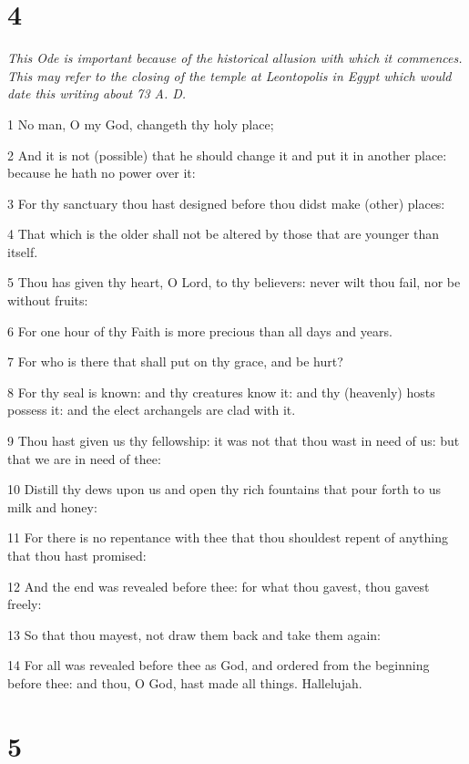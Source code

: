 \chapter{4}

\par \textit{This Ode is important because of the historical allusion with which it commences. This may refer to the closing of the temple at Leontopolis in Egypt which would date this writing about 73 A. D.}

\par 1 No man, O my God, changeth thy holy place;
\par 2 And it is not (possible) that he should change it and put it in another place: because he hath no power over it:
\par 3 For thy sanctuary thou hast designed before thou didst make (other) places:
\par 4 That which is the older shall not be altered by those that are younger than itself.
\par 5 Thou has given thy heart, O Lord, to thy believers: never wilt thou fail, nor be without fruits:
\par 6 For one hour of thy Faith is more precious than all days and years.
\par 7 For who is there that shall put on thy grace, and be hurt?
\par 8 For thy seal is known: and thy creatures know it: and thy (heavenly) hosts possess it: and the elect archangels are clad with it.
\par 9 Thou hast given us thy fellowship: it was not that thou wast in need of us: but that we are in need of thee:
\par 10 Distill thy dews upon us and open thy rich fountains that pour forth to us milk and honey:
\par 11 For there is no repentance with thee that thou shouldest repent of anything that thou hast promised:
\par 12 And the end was revealed before thee: for what thou gavest, thou gavest freely:
\par 13 So that thou mayest, not draw them back and take them again:
\par 14 For all was revealed before thee as God, and ordered from the beginning before thee: and thou, O God, hast made all things. Hallelujah.

\chapter{5}

